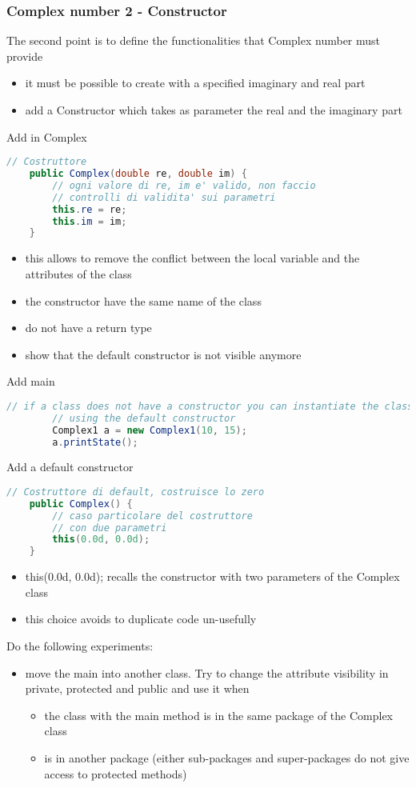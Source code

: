 \documentclass{article}
\begin{document}
\subsubsection{Complex number 2 - Constructor}
The second point is to define the functionalities that Complex number must provide
\begin{itemize}
\item it must be possible to create with a specified imaginary and real part 
\item add a Constructor which takes as parameter the real and the imaginary part
\end{itemize}
Add in Complex
\begin{lstlisting}[language=Java,escapechar=|]
    // Costruttore
	public Complex(double re, double im) {
		// ogni valore di re, im e' valido, non faccio
		// controlli di validita' sui parametri
		this.re = re;
		this.im = im;
	}

\end{lstlisting}
\begin{itemize}
\item this allows to remove the conflict between the local variable and the attributes of the class
\item the constructor have the same name of the class
\item do not have a return type
\item show that the default constructor is not visible anymore
\end{itemize}
Add main
\begin{lstlisting}[language=Java,escapechar=|]
		// if a class does not have a constructor you can instantiate the class
		// using the default constructor
		Complex1 a = new Complex1(10, 15);
		a.printState();
\end{lstlisting}

Add a default constructor
\begin{lstlisting}[language=Java,escapechar=|]
// Costruttore di default, costruisce lo zero
	public Complex() {
		// caso particolare del costruttore
		// con due parametri
		this(0.0d, 0.0d);
	}
\end{lstlisting}
\begin{itemize}
\item this(0.0d, 0.0d); recalls the constructor with two parameters of the Complex class
\item this choice avoids to duplicate code un-usefully
\end{itemize}

Do the following experiments:
\begin{itemize}
\item move the main into another class. Try to change the attribute visibility in private, protected and public and use it when
\begin{itemize}
\item the class with the main method is in the same package of the Complex class
\item is in another package (either sub-packages and super-packages do not give access to protected methods)
\end{itemize}
\end{itemize}
\end{document}

